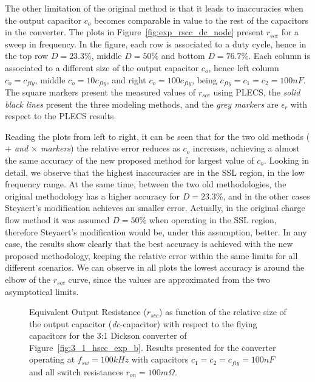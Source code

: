The other limitation of the original method is that it leads to inaccuracies when the output capacitor $c_o$ becomes comparable in value to the rest of the capacitors in the converter. The plots in Figure~\ref{fig:exp_rscc_dc_node} present $r_{scc}$ for a sweep in frequency. In the figure, each row is associated to a duty cycle, hence in the top row $D=23.3\%$, middle $D=50\%$ and bottom $D=76.7\%$. Each column is associated to a different size of the output capacitor $c_o$, hence left column $c_o=c_{fly}$, middle $c_o=10c_{fly}$, and right $c_o=100c_{fly}$, being $c_{fly}=c_1=c_2 =100nF$. The square markers present the measured values of $r_{scc}$ using PLECS, the \emph{solid black lines} present the three modeling methods, and the \emph{grey markers} are $\epsilon_r$ with respect to the PLECS results.

Reading the plots from left to right, it can be seen that for the two old methods (\emph{$+$ and $\times$ markers}) the relative error reduces as $c_o$ increases, achieving a almost the same accuracy of the new proposed method for largest value of $c_o$. Looking in detail, we observe that the highest inaccuracies are in the SSL region, in the low frequency range. At the same time, between the two old methodologies, the original methodology has a higher accuracy for $D=23.3\%$, and in the other cases Steyaert's modification achieves an smaller error. Actually, in the original charge flow method it was assumed $D=50\%$ when operating in the SSL region, therefore Steyaert's modification would be, under this assumption, better. In any case, the results show clearly that the best accuracy is achieved with the new proposed methodology, keeping the relative error within the same limits for all different scenarios. We can observe in all plots the lowest accuracy is around the elbow of the $r_{scc}$ curve, since the values are approximated from the two asymptotical limits.

\begin{figure}[!h]
\newcommand\pHeigh{5cm}
\newcommand\pWidth{7cm}
\centering
     
     \caption{Equivalent Output Resistance ($r_{scc}$) as function of the relative size of the output capacitor (\emph{dc}-capacitor) with respect to the flying capacitors for the 3:1 Dickson converter of Figure~\ref{fig:3_1_hscc_exp_b}. Results presented for the converter operating at $f_{sw}=100kHz$ with capacitors $c_1=c_2=c_{fly}=100nF$ and all switch resistances $r_{on} = 100m\Omega$.}\label{fig:exp_rscc_pwm_node_fsw}
\end{figure}

